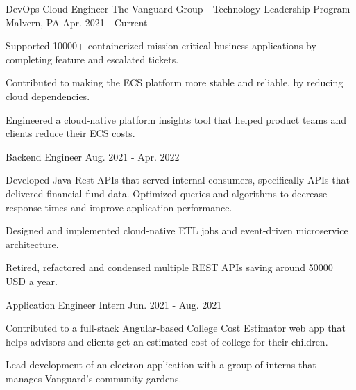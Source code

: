 

\begin{cventries}

  \cventry
    {DevOps Cloud Engineer} %
    {The Vanguard Group - Technology Leadership Program} %
    {Malvern, PA} %
    {Apr. 2021 - Current} %
    {
      \begin{cvitems} %
        \item {Supported 10000+ containerized mission-critical business applications by completing feature and escalated tickets.}
        \item {Contributed to making the ECS platform more stable and reliable, by reducing cloud dependencies.}
        \item {Engineered a cloud-native platform insights tool that helped product teams and clients reduce their ECS costs.}
      \end{cvitems}
    }
  \cventry
    {Backend Engineer} %
    {} %
    {} %
    {Aug. 2021 - Apr. 2022} %
    {
      \begin{cvitems} %
        \item {Developed Java Rest APIs that served internal consumers, specifically APIs that delivered financial fund data. Optimized queries and algorithms to decrease response times and improve application performance.}
        \item {Designed and implemented cloud-native ETL jobs and event-driven microservice architecture.}
        \item {Retired, refactored and condensed multiple REST APIs saving around 50000 USD a year.}
      \end{cvitems}
    }

  \cventry
    {Application Engineer Intern} %
    {} %
    {} %
    {Jun. 2021 - Aug. 2021} %
    {
      \begin{cvitems} %
        \item {Contributed to a full-stack Angular-based College Cost Estimator web app that helps advisors and clients get an estimated cost of college for their children.}
        \item {Lead development of an electron application with a group of interns that manages Vanguard's community gardens.}
      \end{cvitems}
    }


\end{cventries}
